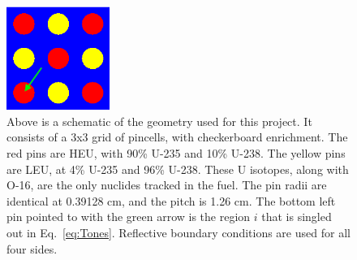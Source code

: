 \documentclass[10pt]{article}
\begin{document}
    
 \begin{figure}
    \begin{center}
      \includegraphics[width=0.3\textwidth]{full_3x3}
      \caption{Above is a schematic of the geometry used for this project. It consists of a 3x3 grid of pincells, with checkerboard enrichment. The red pins are HEU, with 90\% U-235 and 10\% U-238. The yellow pins are LEU, at 4\% U-235 and 96\% U-238. These U isotopes, along with O-16, are the only nuclides tracked in the fuel. The pin radii are identical at 0.39128 cm, and the pitch is 1.26 cm. The bottom left pin pointed to with the green arrow is the region $i$ that is singled out in Eq.~\ref{eq:Tones}. Reflective boundary conditions are used for all four sides.}
      \label{fig:geometry}
    \end{center}
\end{figure}
\end{document}
